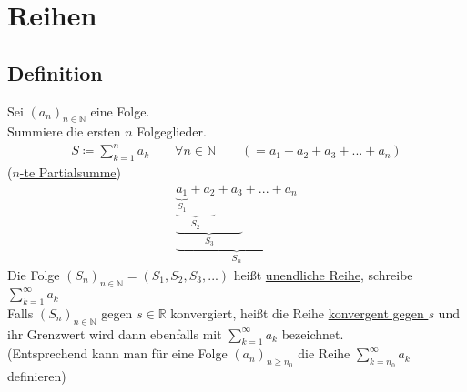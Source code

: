 \documentclass[12pt, titlepage]{article}
\newcommand{\R}{\mathds{R}}
\newcommand{\N}{\mathds{N}}
\renewcommand{\>}{\rightarrow}
\renewcommand{\*}{\cdot}
\begin{document}
	\section{Reihen}
	\subsection{Definition}
	Sei $(a_n)_{n\in\N}$ eine Folge.\\
	Summiere die ersten $n$ Folgeglieder.
	\begin{align*}
		S\coloneqq\sum_{k=1}^{n}a_k\qquad\forall
		 n\in\N\qquad (=a_1+a_2+a_3+...+a_n)
	\end{align*}
	(\underline{$n$-te Partialsumme})
	\begin{align*}
		\underbrace{\underbrace{\underbrace{\underbrace{a_1}_{S_1}+a_2}_{S_2}+a_3}_{S_3}+...+a_n}_{S_n}
	\end{align*}
	Die Folge $(S_n)_{n\in\N}=(S_1,S_2,S_3,...)$ heißt \underline{unendliche Reihe}, schreibe $\sum_{k=1}^{\infty}a_k$\\
	Falls $(S_n)_{n\in\N}$ gegen $s\in\R$ konvergiert, heißt die Reihe \underline{konvergent gegen $s$} und ihr Grenzwert wird dann ebenfalls mit $\sum_{k=1}^{\infty}a_k$ bezeichnet.\\
	(Entsprechend kann man für eine Folge $(a_n)_{n\geq n_0}$ die Reihe $\sum_{k=n_0}^{\infty}a_k$ definieren)
\end{document}
